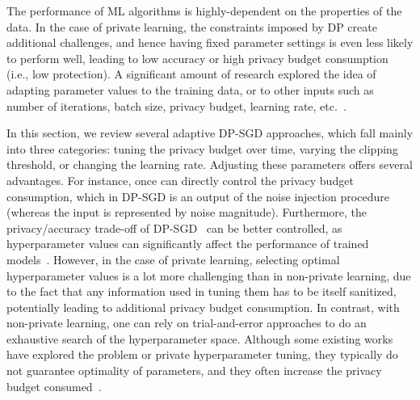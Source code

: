 The performance of ML algorithms is highly-dependent on the properties of the data. In the case of private learning, the constraints imposed by DP create additional challenges, and hence having fixed parameter settings is even less likely to perform well, leading to low accuracy or high privacy budget consumption (i.e., low protection). A significant amount of research explored the idea of adapting parameter values to the training data, or to other inputs such as number of iterations, batch size, privacy budget, learning rate, etc.~\cite{RefWorks:RefID:35-pichapati2019adaclip:,RefWorks:RefID:38-koskelalearning,RefWorks:RefID:48-fay2023adaptive}. %

In this section, we review several adaptive DP-SGD approaches, which fall mainly into three categories: tuning the privacy budget over time, varying the clipping threshold, or changing the learning rate. Adjusting these parameters offers several advantages. For instance, once can directly control the privacy budget consumption, which in DP-SGD is an output of the noise injection procedure (whereas the input is represented by noise magnitude). Furthermore, the privacy/accuracy trade-off of DP-SGD~\cite{RefWorks:RefID:47-yu2019differentially} can be better controlled, as hyperparameter values can significantly affect the performance of trained models~\cite{RefWorks:RefID:39-he2022exploring}. However, in the case of private learning, selecting optimal hyperparameter values is a lot more challenging than in non-private learning, due to the fact that any information used in tuning them has to be itself sanitized, potentially leading to additional privacy budget consumption. In contrast, with non-private learning, one can rely on trial-and-error approaches to do an exhaustive search of the hyperparameter space. Although some existing works have explored the problem or private hyperparameter tuning, they typically do not guarantee optimality of parameters, and they often increase the privacy budget consumed~\cite{RefWorks:RefID:52-liu2019private}.
 
